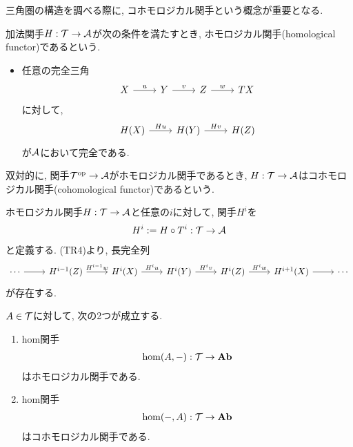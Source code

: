 \documentclass[uplatex, a4paper, 14Q, dvipdfmx]{jsarticle}
\begin{document}
三角圏の構造を調べる際に, コホモロジカル関手という概念が重要となる. 

\begin{definition}[ホモロジカル関手とコホモロジカル関手]
  加法関手$H: \mathcal{T} \to \mathcal{A}$が次の条件を満たすとき, ホモロジカル関手(homological functor)であるという. 
  \begin{itemize}
    \item 任意の完全三角
    \[\begin{tikzcd}
      X & Y & Z & TX
      \arrow["u", from=1-1, to=1-2]
      \arrow["v", from=1-2, to=1-3]
      \arrow["w", from=1-3, to=1-4]
    \end{tikzcd}\]
    に対して, 
    \[\begin{tikzcd}
      {H(X)} & {H(Y)} & {H(Z)}
      \arrow["Hu", from=1-1, to=1-2]
      \arrow["Hv", from=1-2, to=1-3]
    \end{tikzcd}\]
    が$\mathcal{A}$において完全である.  
  \end{itemize}
  双対的に, 関手$\mathcal{T}^{\mathrm{op}} \to \mathcal{A}$がホモロジカル関手であるとき, $H: \mathcal{T} \to \mathcal{A}$はコホモロジカル関手(cohomological functor)であるという. 
\end{definition}

\begin{remark} \label{homological_log_exact}
  ホモロジカル関手$H: \mathcal{T} \to \mathcal{A}$と任意の$i$に対して, 関手$H^i$を
  \begin{align*}
    H^i := H \circ T^i: \mathcal{T} \to \mathcal{A}
  \end{align*}
  と定義する. 
  (TR4)より, 長完全列
  \[\begin{tikzcd}
    \cdots & {H^{i-1}(Z)} & {H^i(X)} & {H^i(Y)} & {H^i(Z)} & {H^{i+1}(X)} & \cdots
    \arrow[from=1-1, to=1-2]
    \arrow["{H^{i-1}w}", from=1-2, to=1-3]
    \arrow["H^iu", from=1-3, to=1-4]
    \arrow["H^iv", from=1-4, to=1-5]
    \arrow["H^iw", from=1-5, to=1-6]
    \arrow[from=1-6, to=1-7]
  \end{tikzcd}\]
  が存在する. 
\end{remark}

\begin{theorem} \label{hom_homological}
  $A \in \mathcal{T}$に対して, 次の2つが成立する. 
  \begin{enumerate}
    \item hom関手
    \begin{align*}
      \hom(A, -): \mathcal{T} \to \mathbf{Ab}
    \end{align*}
    はホモロジカル関手である. 
    \item hom関手
    \begin{align*}
      \hom(-, A): \mathcal{T} \to \mathbf{Ab}
    \end{align*}
    はコホモロジカル関手である. 
  \end{enumerate}
\end{theorem}
\end{document}
